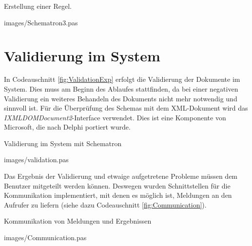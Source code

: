 \begin{program}
\caption{Erstellung einer Regel.}
\label{fig:Schematron3}
\lstset{language=Pascal, 
        basicstyle=\tiny\ttfamily, 
        numbers=left,
        numberstyle=\tiny, 
        stepnumber=5, 
        firstnumber=0,
        showstringspaces=false}
 {images/Schematron3.pas}
\end{program}


\section{Validierung im System}
In Codeauschnitt \ref{fig:ValidationExp} erfolgt die Validierung der Dokumente im System. 
Dies muss am Beginn des Ablaufes stattfinden, da bei einer negativen Validierung ein weiteres Behandeln des Dokuments nicht mehr notwendig und sinnvoll ist. 
Für die Überprüfung des Schemas mit dem XML-Dokument wird das \emph{IXMLDOMDocument2}-Interface verwendet.
Dies ist eine Komponente von Microsoft, die nach Delphi portiert wurde.

\begin{program}
\caption{Validierung im System mit Schematron}
\label{fig:ValidationExp}
\lstset{language=Pascal, 
        basicstyle=\tiny\ttfamily, 
        numbers=left,
        numberstyle=\tiny, 
        stepnumber=5, 
        firstnumber=0,
        showstringspaces=false}
 {images/validation.pas}
\end{program}

Das Ergebnis der Validierung und etwaige aufgetretene Probleme müssen dem Benutzer mitgeteilt werden können.
Deswegen wurden Schnittstellen für die Kommunikation implementiert, mit denen es möglich ist, Meldungen an den Aufrufer zu liefern (siehe dazu Codeauschnitt \ref{fig:Communication}).

\begin{program}
\caption{Kommunikation von Meldungen und Ergebnissen}
\label{fig:Communication}
\lstset{language=Pascal, 
        basicstyle=\tiny\ttfamily, 
        numbers=left,
        numberstyle=\tiny, 
        stepnumber=5, 
        firstnumber=0,
        showstringspaces=false}
 {images/Communication.pas}
\end{program}